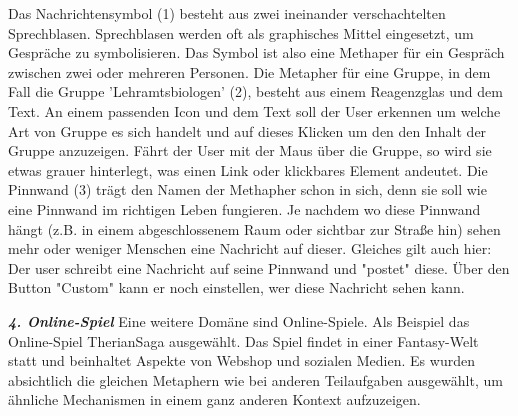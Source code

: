 \documentclass[a4paper,10pt]{article}
\begin{document}
Das Nachrichtensymbol (1) besteht aus zwei ineinander verschachtelten Sprechblasen. Sprechblasen werden oft als graphisches Mittel eingesetzt, um Gespräche zu symbolisieren. Das Symbol ist also eine Methaper für ein Gespräch zwischen zwei oder mehreren Personen. \newline
Die Metapher für eine Gruppe, in dem Fall die Gruppe 'Lehramtsbiologen' (2), besteht aus einem Reagenzglas und dem Text. An einem passenden Icon und dem Text soll der User erkennen um welche Art von Gruppe es sich handelt und auf dieses Klicken um den den Inhalt der Gruppe anzuzeigen. Fährt der User mit der Maus über die Gruppe, so wird sie etwas grauer hinterlegt, was einen Link oder klickbares Element andeutet. \newline
Die Pinnwand (3) trägt den Namen der Methapher schon in sich, denn sie soll wie eine Pinnwand im richtigen Leben fungieren. Je nachdem wo diese Pinnwand hängt (z.B. in einem abgeschlossenem Raum oder sichtbar zur Straße hin) sehen mehr oder weniger Menschen eine Nachricht auf dieser. Gleiches gilt auch hier: Der user schreibt eine Nachricht auf seine Pinnwand und "postet" diese. Über den Button "Custom" kann er noch einstellen, wer diese Nachricht sehen kann. \newline

\pagebreak
\textbf{\textit{4. Online-Spiel}} \newline
Eine weitere Domäne sind Online-Spiele. Als Beispiel das Online-Spiel TherianSaga ausgewählt. Das Spiel findet in einer Fantasy-Welt statt und beinhaltet Aspekte  von Webshop und sozialen Medien. Es wurden absichtlich die gleichen Metaphern wie bei anderen Teilaufgaben ausgewählt, um ähnliche Mechanismen in einem ganz anderen Kontext aufzuzeigen.
\end{document}
